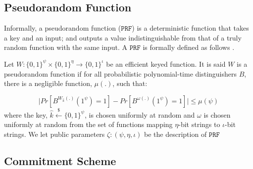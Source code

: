 \subsection{Pseudorandom Function}

Informally, a pseudorandom function ($\mathtt{PRF}$) is a deterministic function that takes a key and an input; and outputs a value  indistinguishable from that of  a truly random function with the same input.   A $\mathtt{PRF}$ is formally defined as follows \cite{DBLP:books/crc/KatzLindell2007}. 
\begin{definition} Let $W:\{0,1\}^{\scriptscriptstyle\psi}\times \{0,1\}^{\scriptscriptstyle \eta}\rightarrow \{0,1\}^{\scriptscriptstyle  \iota}$ be an efficient  keyed function. It is said $W$ is a pseudorandom function if for all probabilistic polynomial-time distinguishers $B$, there is a negligible function, $\mu(.)$, such that:

\begin{equation*}
\bigg | Pr[B^{\scriptscriptstyle W_{\hat{k}}(.)}(1^{\scriptscriptstyle \psi})=1]- Pr[B^{\scriptscriptstyle \omega(.)}(1^{\scriptscriptstyle \psi})=1] \bigg |\leq \mu(\psi)
\end{equation*}
where  the key, $\hat{k}\stackrel{\scriptscriptstyle\$}\leftarrow\{0,1\}^{\scriptscriptstyle\psi}$, is chosen uniformly at random and $\omega$ is chosen uniformly at random from the set of functions mapping $\eta$-bit strings to $\iota$-bit strings. We let public parameters $\zeta:(\psi,\eta, \iota)$ be the description of $\mathtt{PRF}$
\end{definition}



\subsection{Commitment Scheme}


